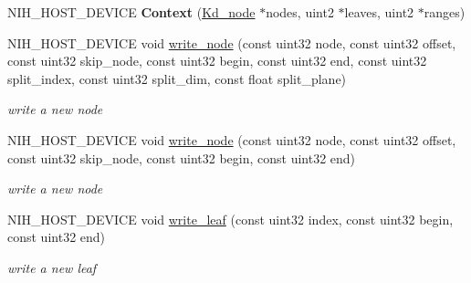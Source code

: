 \begin{DoxyCompactItemize}
\item 
\hypertarget{structnih_1_1cuda_1_1_kd__context_1_1_context_a18c14f78e8c502ed909782b95f147d86}{
\-N\-I\-H\-\_\-\-H\-O\-S\-T\-\_\-\-D\-E\-V\-I\-C\-E {\bfseries \-Context} (\hyperlink{structnih_1_1_kd__node}{\-Kd\-\_\-node} $\ast$nodes, uint2 $\ast$leaves, uint2 $\ast$ranges)}
\label{structnih_1_1cuda_1_1_kd__context_1_1_context_a18c14f78e8c502ed909782b95f147d86}

\item 
\hypertarget{structnih_1_1cuda_1_1_kd__context_1_1_context_abea9761aabae14fab3ab99ba17a7bf07}{
\-N\-I\-H\-\_\-\-H\-O\-S\-T\-\_\-\-D\-E\-V\-I\-C\-E void \hyperlink{structnih_1_1cuda_1_1_kd__context_1_1_context_abea9761aabae14fab3ab99ba17a7bf07}{write\-\_\-node} (const uint32 node, const uint32 offset, const uint32 skip\-\_\-node, const uint32 begin, const uint32 end, const uint32 split\-\_\-index, const uint32 split\-\_\-dim, const float split\-\_\-plane)}
\label{structnih_1_1cuda_1_1_kd__context_1_1_context_abea9761aabae14fab3ab99ba17a7bf07}

\begin{DoxyCompactList}\small\item\em write a new node \end{DoxyCompactList}\item 
\hypertarget{structnih_1_1cuda_1_1_kd__context_1_1_context_a69c7d40b900ad62118b3e4b01ddb45c2}{
\-N\-I\-H\-\_\-\-H\-O\-S\-T\-\_\-\-D\-E\-V\-I\-C\-E void \hyperlink{structnih_1_1cuda_1_1_kd__context_1_1_context_a69c7d40b900ad62118b3e4b01ddb45c2}{write\-\_\-node} (const uint32 node, const uint32 offset, const uint32 skip\-\_\-node, const uint32 begin, const uint32 end)}
\label{structnih_1_1cuda_1_1_kd__context_1_1_context_a69c7d40b900ad62118b3e4b01ddb45c2}

\begin{DoxyCompactList}\small\item\em write a new node \end{DoxyCompactList}\item 
\hypertarget{structnih_1_1cuda_1_1_kd__context_1_1_context_adbbe9d72f242cfa2270d3e90cbd1bb60}{
\-N\-I\-H\-\_\-\-H\-O\-S\-T\-\_\-\-D\-E\-V\-I\-C\-E void \hyperlink{structnih_1_1cuda_1_1_kd__context_1_1_context_adbbe9d72f242cfa2270d3e90cbd1bb60}{write\-\_\-leaf} (const uint32 index, const uint32 begin, const uint32 end)}
\label{structnih_1_1cuda_1_1_kd__context_1_1_context_adbbe9d72f242cfa2270d3e90cbd1bb60}

\begin{DoxyCompactList}\small\item\em write a new leaf \end{DoxyCompactList}\end{DoxyCompactItemize}
